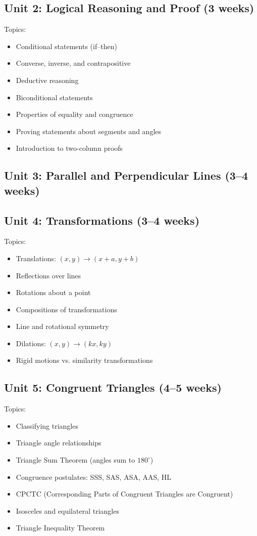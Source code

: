 \documentclass[12pt,oneside]{book}
\begin{document}
\subsection*{Unit 2: Logical Reasoning and Proof (3 weeks)}
Topics:
\begin{itemize}[leftmargin=2em]
    \item Conditional statements (if--then)
    \item Converse, inverse, and contrapositive
    \item Deductive reasoning
    \item Biconditional statements
    \item Properties of equality and congruence
    \item Proving statements about segments and angles
    \item Introduction to two-column proofs
\end{itemize}

\subsection*{Unit 3: Parallel and Perpendicular Lines (3--4 weeks)}

\subsection*{Unit 4: Transformations (3--4 weeks)}
Topics:
\begin{itemize}[leftmargin=2em]
    \item Translations: $(x,y)\rightarrow(x+a,y+b)$
    \item Reflections over lines
    \item Rotations about a point
    \item Compositions of transformations
    \item Line and rotational symmetry
    \item Dilations: $(x,y)\rightarrow(kx,ky)$
    \item Rigid motions vs. similarity transformations
\end{itemize}

\subsection*{Unit 5: Congruent Triangles (4--5 weeks)}
Topics:
\begin{itemize}[leftmargin=2em]
    \item Classifying triangles
    \item Triangle angle relationships
    \item Triangle Sum Theorem (angles sum to $180^\circ$)
    \item Congruence postulates: SSS, SAS, ASA, AAS, HL
    \item CPCTC (Corresponding Parts of Congruent Triangles are Congruent)
    \item Isosceles and equilateral triangles
    \item Triangle Inequality Theorem
\end{itemize}
\end{document}
